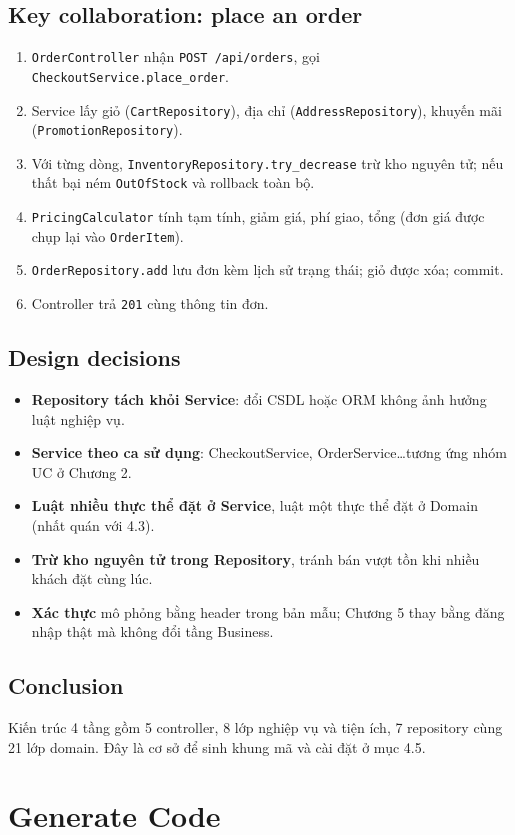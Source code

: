 \documentclass[12pt,a4paper,oneside]{report}
\begin{document}
\subsection{Key collaboration: place an order}
\begin{enumerate}\item \texttt{OrderController} nhận \texttt{POST /api/orders}, gọi \texttt{CheckoutService.place\_order}.\item Service lấy giỏ (\texttt{CartRepository}), địa chỉ (\texttt{AddressRepository}), khuyến mãi (\texttt{PromotionRepository}).\item Với từng dòng, \texttt{InventoryRepository.try\_decrease} trừ kho nguyên tử; nếu thất bại ném \texttt{OutOfStock} và rollback toàn bộ.\item \texttt{PricingCalculator} tính tạm tính, giảm giá, phí giao, tổng (đơn giá được chụp lại vào \texttt{OrderItem}).\item \texttt{OrderRepository.add} lưu đơn kèm lịch sử trạng thái; giỏ được xóa; commit.\item Controller trả \texttt{201} cùng thông tin đơn.\end{enumerate}
\subsection{Design decisions}
\begin{itemize}\item \textbf{Repository tách khỏi Service}: đổi CSDL hoặc ORM không ảnh hưởng luật nghiệp vụ.\item \textbf{Service theo ca sử dụng}: CheckoutService, OrderService\ldots tương ứng nhóm UC ở Chương 2.\item \textbf{Luật nhiều thực thể đặt ở Service}, luật một thực thể đặt ở Domain (nhất quán với 4.3).\item \textbf{Trừ kho nguyên tử trong Repository}, tránh bán vượt tồn khi nhiều khách đặt cùng lúc.\item \textbf{Xác thực} mô phỏng bằng header trong bản mẫu; Chương 5 thay bằng đăng nhập thật mà không đổi tầng Business.\end{itemize}
\subsection{Conclusion}
Kiến trúc 4 tầng gồm 5 controller, 8 lớp nghiệp vụ và tiện ích, 7 repository cùng 21 lớp domain. Đây là cơ sở để sinh khung mã và cài đặt ở mục 4.5.


\section{Generate Code}
\end{document}
